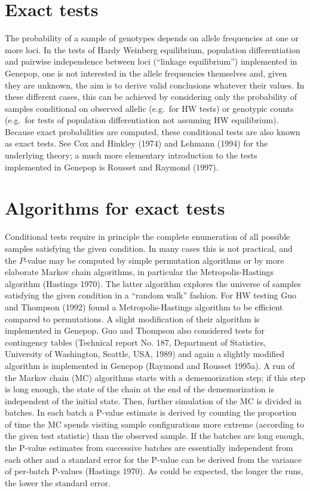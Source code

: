 \documentclass[12pt,]{book}
\begin{document}
\section{Exact tests}\label{exact-tests}

The probability of a sample of genotypes depends on allele frequencies
at one or more loci. In the tests of Hardy Weinberg equilibrium,
population differentiation and pairwise independence between loci
(``linkage equilibrium'') implemented in Genepop, one is not interested
in the allele frequencies themselves and, given they are unknown, the
aim is to derive valid conclusions whatever their values. In these
different cases, this can be achieved by considering only the
probability of samples conditional
on observed allelic (e.g.~for HW tests) or genotypic counts (e.g.~for
tests of population differentiation not assuming HW equilibrium).
Because exact probabilities are computed, these conditional tests are
also known as exact tests. See Cox and Hinkley (1974) and Lehmann (1994)
for the underlying theory; a much more elementary introduction to the
tests implemented in Genepop is Rousset and Raymond (1997).

\section{Algorithms for exact tests}\label{algorithms-for-exact-tests}

Conditional tests require in principle the complete enumeration of all
possible samples satisfying the given condition. In many cases this is
not practical, and the \(P\)-value may be computed by simple permutation
algorithms or by more
elaborate Markov chain algorithms, in particular the Metropolis-Hastings
algorithm (Hastings
1970). The latter
algorithm explores the universe of samples satisfying the given
condition in a ``random walk'' fashion. For HW testing Guo and Thompson
(1992) found a Metropolis-Hastings algorithm to be efficient compared to
permutations. A slight modification of their algorithm is implemented in
Genepop. Guo and Thompson also considered tests for contingency tables
(Technical report No. 187, Department of Statistics, University of
Washington, Seattle, USA, 1989) and again a slightly modified algorithm
is implemented in Genepop (Raymond and Rousset 1995a). A run of the
Markov chain (MC) algorithms starts with a dememorization step; if this
step is long enough, the state of the chain at the end of the
dememorization is independent of the initial state. Then, further
simulation of the MC is divided in batches. In each batch a P-value
estimate is derived by counting the proportion of time the MC spends
visiting sample configurations more extreme (according to the given test
statistic) than the observed sample. If the batches are long enough, the
P-value estimates from successive batches are essentially independent
from each other and a standard error for the P-value can be derived from
the variance of per-batch P-values (Hastings 1970). As could be
expected, the longer the runs, the lower the standard error.
\end{document}
